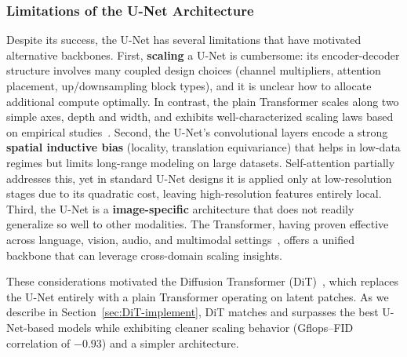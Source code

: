 \documentclass[../../book-main.tex]{subfiles}
\begin{document}
\subsubsection{Limitations of the U-Net Architecture}
\label{sec:unet-limitations}

Despite its success, the U-Net has several limitations that have
motivated alternative backbones. First, \textbf{scaling} a U-Net is
cumbersome: its encoder-decoder structure involves many coupled
design choices (channel multipliers, attention placement,
up/downsampling block types), and it is unclear how to allocate
additional compute optimally. In contrast, the plain Transformer
scales along two simple axes, depth and width, and exhibits
well-characterized scaling laws based on empirical
studies~\citep{kaplan2020scaling}. Second, the U-Net's convolutional
layers encode a strong \textbf{spatial inductive bias} (locality,
translation equivariance) that helps in low-data regimes but limits
long-range modeling on large datasets. Self-attention partially
addresses this, yet in standard U-Net designs it is applied only at
low-resolution stages due to its quadratic cost, leaving
high-resolution features entirely local. Third, the U-Net is a
\textbf{image-specific} architecture that does not readily generalize
so well to other modalities. The Transformer, having proven effective
across language, vision, audio, and multimodal
settings~\citep{vaswani2017attention}, offers a unified backbone that
can leverage cross-domain scaling insights.

These considerations motivated the Diffusion Transformer
(DiT)~\citep{peebles2023scalable}, which replaces the U-Net entirely
with a plain Transformer operating on latent patches. As we describe
in Section~\ref{sec:DiT-implement}, DiT matches and surpasses the
best U-Net-based models while exhibiting cleaner scaling behavior
(Gflops--FID correlation of $-0.93$) and a simpler architecture.

\end{document}

